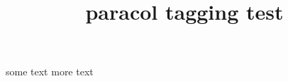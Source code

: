 \documentclass{article}
\title{paracol tagging test}
\begin{document}
\begin{paracol}{2}
some text
\switchcolumn
more text
\end{paracol}
\end{document}
